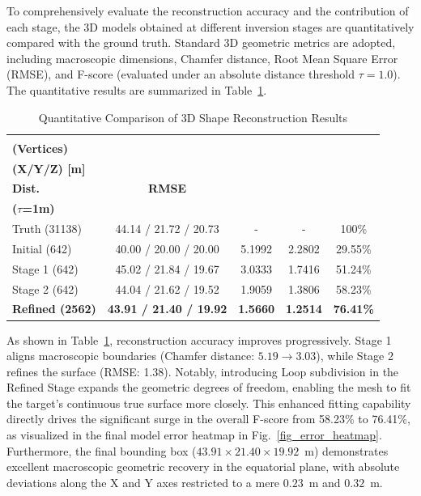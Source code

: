\documentclass[conference]{IEEEtran}
\begin{document}
To comprehensively evaluate the reconstruction accuracy and the contribution of each stage, the 3D models obtained at different inversion stages are quantitatively compared with the ground truth. Standard 3D geometric metrics are adopted, including macroscopic dimensions, Chamfer distance, Root Mean Square Error (RMSE), and F-score (evaluated under an absolute distance threshold $\tau = 1.0$). The quantitative results are summarized in Table~\ref{tab_comprehensive_metrics}.

\begin{table}[htbp]
	\caption{Quantitative Comparison of 3D Shape Reconstruction Results}
	\label{tab_comprehensive_metrics}
	\centering
	\renewcommand{\arraystretch}{1.3} 
	\setlength{\tabcolsep}{4pt} 
	\begin{tabular}{lcccc}
		\toprule 
		\makecell[c]{\textbf{Model} \\ \textbf{(Vertices)}} & 
		\makecell[c]{\textbf{Dimensions} \\ \textbf{(X/Y/Z) [m]}} & 
		\makecell[c]{\textbf{Chamfer} \\ \textbf{Dist.}} & 
		\textbf{RMSE} & 
		\makecell[c]{\textbf{F-Score} \\ \textbf{($\tau$=1m)}} \\ 
		\midrule 
		
		Truth (31138) & 44.14 / 21.72 / 20.73 & - & - & 100\% \\
		Initial (642) & 40.00 / 20.00 / 20.00 & 5.1992 & 2.2802 & 29.55\% \\
		Stage 1 (642) & 45.02 / 21.84 / 19.67 & 3.0333 & 1.7416 & 51.24\% \\
		Stage 2 (642) & 44.04 / 21.62 / 19.52 & 1.9059 & 1.3806 & 58.23\% \\
		\textbf{Refined (2562)} & \textbf{43.91 / 21.40 / 19.92} & \textbf{1.5660} & \textbf{1.2514} & \textbf{76.41\%} \\ 
		\bottomrule 
	\end{tabular}
\end{table}

As shown in Table~\ref{tab_comprehensive_metrics}, reconstruction accuracy improves progressively. Stage 1 aligns macroscopic boundaries (Chamfer distance: $5.19 \to 3.03$), while Stage 2 refines the surface (RMSE: 1.38). Notably, introducing Loop subdivision in the Refined Stage expands the geometric degrees of freedom, enabling the mesh to fit the target's continuous true surface more closely. This enhanced fitting capability directly drives the significant surge in the overall F-score from 58.23\% to 76.41\%, as visualized in the final model error heatmap in Fig.~\ref{fig_error_heatmap}. Furthermore, the final bounding box ($43.91 \times 21.40 \times 19.92$~m) demonstrates excellent macroscopic geometric recovery in the equatorial plane, with absolute deviations along the X and Y axes restricted to a mere $0.23$~m and $0.32$~m.
\end{document}
